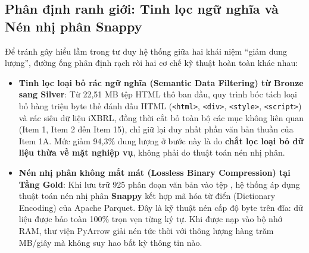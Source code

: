 \subsection{Phân định ranh giới: Tinh lọc ngữ nghĩa và Nén nhị phân Snappy}
Để tránh gây hiểu lầm trong tư duy hệ thống giữa hai khái niệm ``giảm dung lượng'', đường ống phân định rạch ròi hai cơ chế kỹ thuật hoàn toàn khác nhau:
\begin{itemize}
    \item \textbf{Tinh lọc loại bỏ rác ngữ nghĩa (Semantic Data Filtering) từ Bronze sang Silver}: Từ 22,51 MB tệp HTML thô ban đầu, quy trình bóc tách loại bỏ hàng triệu byte thẻ đánh dấu HTML (\texttt{<html>}, \texttt{<div>}, \texttt{<style>}, \texttt{<script>}) và rác siêu dữ liệu iXBRL, đồng thời cắt bỏ toàn bộ các mục không liên quan (Item 1, Item 2 đến Item 15), chỉ giữ lại duy nhất phần văn bản thuần của Item 1A. Mức giảm 94,3\% dung lượng ở bước này là do \textbf{chắt lọc loại bỏ dữ liệu thừa về mặt nghiệp vụ}, không phải do thuật toán nén nhị phân.
    \item \textbf{Nén nhị phân không mất mát (Lossless Binary Compression) tại Tầng Gold}: Khi lưu trữ 925 phân đoạn văn bản vào tệp , hệ thống áp dụng thuật toán nén nhị phân \textbf{Snappy} kết hợp mã hóa từ điển (Dictionary Encoding) của Apache Parquet. Đây là kỹ thuật nén cấp độ byte trên đĩa: dữ liệu được bảo toàn 100\% trọn vẹn từng ký tự. Khi được nạp vào bộ nhớ RAM, thư viện PyArrow giải nén tức thời với thông lượng hàng trăm MB/giây mà không suy hao bất kỳ thông tin nào.
\end{itemize}

